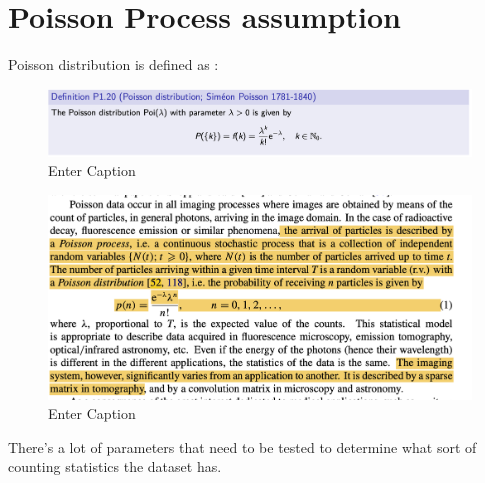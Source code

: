 \section{Poisson Process assumption}

Poisson distribution is defined as \cite{poissonRecherchesProbabiliteJugements1837}:

\begin{figure}
    \centering
    \includegraphics[width=1\linewidth]{images/2024-08-27-15-54-39.png}
    \caption{Enter Caption}
    \label{fig:enter-label}
\end{figure}


\begin{figure}
    \centering
    \includegraphics[width=1\linewidth]{images/JD-54-image.png}
    \caption{Enter Caption}
    \label{fig:enterl}
\end{figure}


There's a lot of parameters that need to be tested to determine what sort of counting statistics the dataset has.

